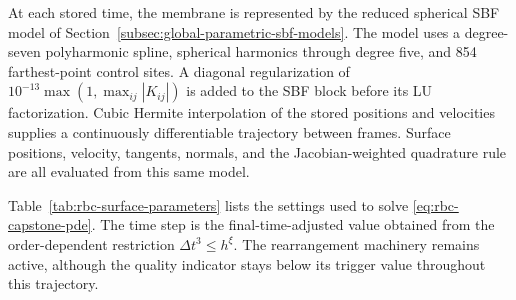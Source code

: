 \documentclass[a4paper,fleqn]{cas-sc}
\begin{document}
At each stored time, the membrane is represented by the reduced spherical SBF
model of Section~\ref{subsec:global-parametric-sbf-models}.  The model uses a
degree-seven polyharmonic spline, spherical harmonics through degree five, and
854 farthest-point control sites.  A diagonal regularization of
\(10^{-13}\max(1,\max_{ij}|K_{ij}|)\) is added to the SBF block before its LU
factorization.  Cubic Hermite interpolation of the stored positions and
velocities supplies a continuously differentiable trajectory between frames.
Surface positions, velocity, tangents, normals, and the Jacobian-weighted
quadrature rule are all evaluated from this same model.

Table~\ref{tab:rbc-surface-parameters} lists the settings used to solve
\eqref{eq:rbc-capstone-pde}.  The time step is the final-time-adjusted value
obtained from the order-dependent restriction \(\Delta t^3\le h^\xi\).  The
rearrangement machinery remains active, although the quality indicator stays
below its trigger value throughout this trajectory.
\end{document}
